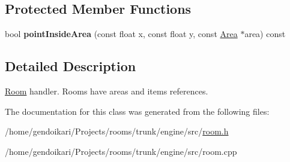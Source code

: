 \subsection*{Protected Member Functions}
\begin{DoxyCompactItemize}
\item 
\hypertarget{classRoom_aee1a7950a80389ee2c4f6f73052583d0}{
bool {\bfseries pointInsideArea} (const float x, const float y, const \hyperlink{classArea}{Area} $\ast$area) const }
\label{classRoom_aee1a7950a80389ee2c4f6f73052583d0}

\end{DoxyCompactItemize}


\subsection{Detailed Description}
\hyperlink{classRoom}{Room} handler. Rooms have areas and items references. 

The documentation for this class was generated from the following files:\begin{DoxyCompactItemize}
\item 
/home/gendoikari/Projects/rooms/trunk/engine/src/\hyperlink{room_8h}{room.h}\item 
/home/gendoikari/Projects/rooms/trunk/engine/src/room.cpp\end{DoxyCompactItemize}
